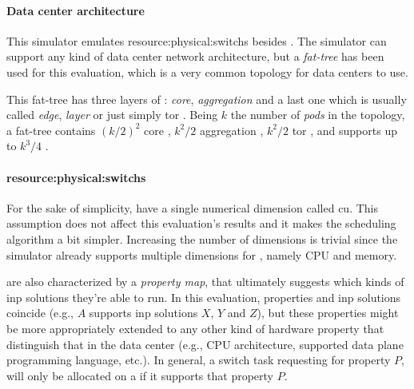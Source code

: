 \paragraph{Data center architecture}
This simulator emulates \glspl{resource:physical:switch} besides .
The simulator can support any kind of data center network architecture, but a \textit{fat-tree} has been used for this evaluation, which is a very common topology for data centers to use.

This fat-tree has three layers of : \textit{core}, \textit{aggregation} and a last one which is usually called \textit{edge}, \textit{layer} or just simply \gls{tor} .
Being $k$ the number of \textit{pods} in the topology, a fat-tree contains $(k/2)^2$ core , $k^2/2$ aggregation , $k^2/2$ \gls{tor} , and supports up to $k^3/4$ .

\paragraph{\Glspl{resource:physical:switch}} \label{simulator_switch_resources}
For the sake of simplicity,  have a single numerical dimension called \gls{cu}.
This assumption does not affect this evaluation's results and it makes the scheduling algorithm a bit simpler.
Increasing the number of  dimensions is trivial since the simulator already supports multiple dimensions for , namely CPU and memory.

 are also characterized by a \textit{property map}, that ultimately suggests which kinds of \gls{inp} solutions they're able to run.
In this evaluation, properties and \gls{inp} solutions coincide (e.g.,  $A$ supports \gls{inp} solutions $X$, $Y$ and $Z$), but these properties might be more appropriately extended to any other kind of hardware property that distinguish that  in the data center (e.g., CPU architecture, supported data plane programming language, etc.).
In general, a switch task requesting for property $P$, will only be allocated on a  if it supports that property $P$.